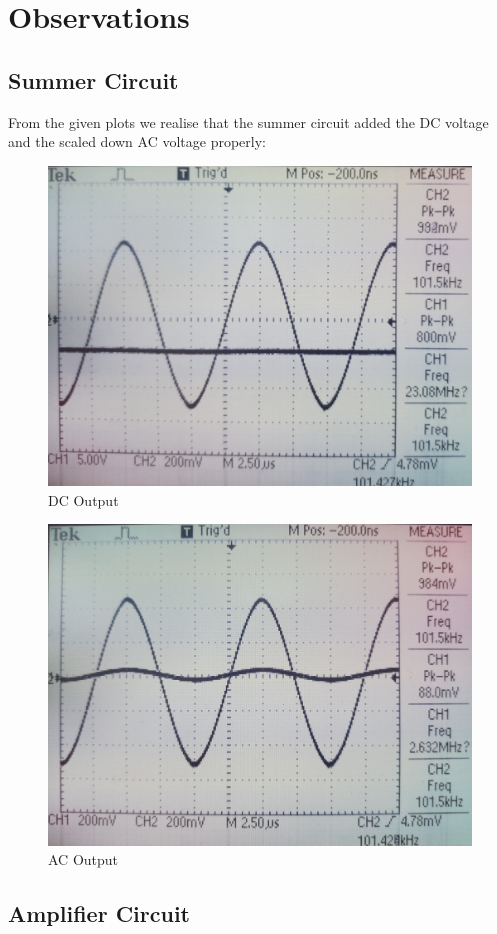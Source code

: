 \documentclass[12pt]{article}
\begin{document}
\section{Observations}

\subsection{Summer Circuit}

From the given plots we realise that the summer circuit added the DC voltage and the scaled down AC voltage properly:
\begin{figure}[H]
	\centering
	\includegraphics[width = 0.8\linewidth, trim = {0 0 0 0}, clip]{14_45_57.jpg}
	\caption{DC Output}
\end{figure}
\begin{figure}[H]
	\centering
	\includegraphics[width = 0.8\linewidth, trim = {0 0 0 0}, clip]{14_46_48.jpg}
	\caption{AC Output}
\end{figure}

\subsection{Amplifier Circuit}
\end{document}
